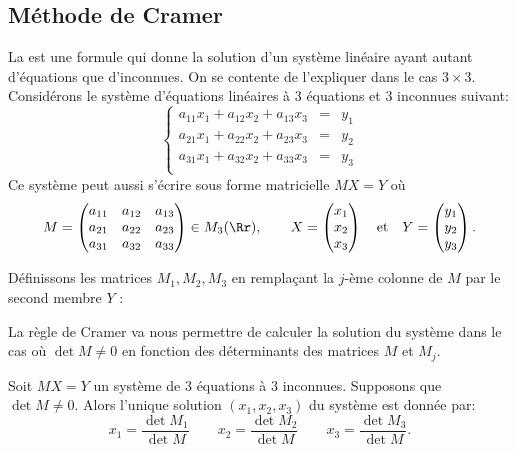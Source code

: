 \documentclass[11pt,class=report,crop=false]{standalone}
\begin{document}
\subsection{Méthode de Cramer}

La  est une formule qui donne la solution d'un système linéaire ayant autant d'équations que d'inconnues. On se contente de l'expliquer dans le cas $3 \times 3$.
Considérons le système d'équations linéaires à $3$ équations et $3$ inconnues suivant:
\[
\left\{
\begin{array}{ccc}
	a_{11} x_1 + a_{12} x_2 + a_{13} x_3 & = & y_1\\
	a_{21} x_1 + a_{22} x_2 + a_{23} x_3 & = & y_2\\
	a_{31} x_1 + a_{32} x_2 + a_{33} x_3 & = & y_3\\	
\end{array}
\right.
\]
Ce système peut aussi s'écrire sous forme matricielle $MX=Y$ où
$$
M = 
\begin{pmatrix}
	a_{11} & a_{12} & a_{13}\\
	a_{21} & a_{22} & a_{23}\\
	a_{31} & a_{32}& a_{33}
\end{pmatrix} \in M_{3}(\Rr), \qquad 
X = \begin{pmatrix} x_1\\x_2 \\x_3 \end{pmatrix}  \quad \text{et} \quad 
Y = \begin{pmatrix} y_1\\y_2\\y_3 \end{pmatrix}.
$$


Définissons les matrices $M_1, M_2, M_3$ en remplaçant la $j$-ème
colonne de $M$ par le second membre $Y$ :


La règle de Cramer va nous
permettre de calculer la solution du système dans le cas où
$\det M \neq 0$ en fonction des déterminants des matrices $M$ et
$M_j$.

\begin{theoreme} 
	Soit $MX = Y$ un système de $3$ équations à $3$ inconnues. 
	Supposons que $\det M \neq 0$.
	Alors l'unique solution $(x_1,x_2,x_3)$ du système est donnée par:
	$$
	x_1 = \frac{\det M_1}{\det M} \qquad 
	x_2 = \frac{\det M_2}{\det M} \qquad
	x_3 = \frac{\det M_3}{\det M}.
	$$
\end{theoreme}
\end{document}
